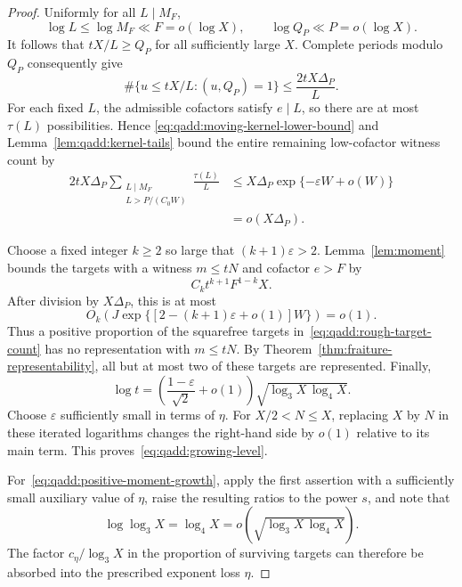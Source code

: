 \begin{proof}
Uniformly for all $L\mid M_F$,
\[
 \log L\leq\log M_F\ll F=o(\log X),
 \qquad
 \log Q_P\ll P=o(\log X).
\]
It follows that $tX/L\geq Q_P$ for all sufficiently large $X$.
Complete periods modulo $Q_P$ consequently give
\[
 \#\{u\leq tX/L:(u,Q_P)=1\}
 \leq\frac{2tX\Delta_P}{L}.
\]
For each fixed $L$, the admissible cofactors satisfy $e\mid L$,
so there are at most $\tau(L)$ possibilities. Hence
\eqref{eq:qadd:moving-kernel-lower-bound} and
Lemma~\ref{lem:qadd:kernel-tails} bound the entire remaining
low-cofactor witness count by
\begin{align*}
 2tX\Delta_P
     \sum_{\substack{L\mid M_F\\L>P/(C_0W)}}
                \frac{\tau(L)}L
 &\leq X\Delta_P
      \exp\{-\varepsilon W+o(W)\}\\
 &=o(X\Delta_P).
\end{align*}

Choose a fixed integer $k\geq2$ so large that
$(k+1)\varepsilon>2$. Lemma~\ref{lem:moment} bounds the
targets with a witness $m\leq tN$ and cofactor $e>F$ by
\[
 C_kt^{k+1}F^{1-k}X.
\]
After division by $X\Delta_P$, this is at most
\[
 O_k\left(
 J\exp\{[2-(k+1)\varepsilon+o(1)]W\}
 \right)=o(1).
\]
Thus a positive proportion of the squarefree targets
in~\eqref{eq:qadd:rough-target-count} has no representation
with $m\leq tN$. By
Theorem~\ref{thm:fraiture-representability}, all but at most
two of these targets are represented. Finally,
\[
 \log t
 =\left(\frac{1-\varepsilon}{\sqrt2}+o(1)\right)
          \sqrt{\log_3X\,\log_4X}.
\]
Choose $\varepsilon$ sufficiently small in terms of $\eta$.
For $X/2<N\leq X$, replacing $X$ by $N$ in these iterated
logarithms changes the right-hand side by $o(1)$ relative to
its main term. This proves~\eqref{eq:qadd:growing-level}.

For~\eqref{eq:qadd:positive-moment-growth}, apply the first
assertion with a sufficiently small auxiliary value of $\eta$,
raise the resulting ratios to the power $s$, and note that
\[
 \log\log_3X=\log_4X
 =o\left(\sqrt{\log_3X\,\log_4X}\right).
\]
The factor $c_\eta/\log_3X$ in the proportion of surviving
targets can therefore be absorbed into the prescribed exponent
loss $\eta$.
\end{proof}


